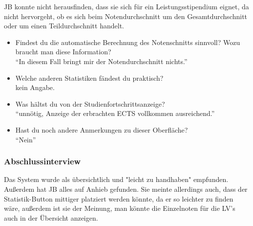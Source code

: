 \documentclass[a4paper,10pt]{scrartcl}
\begin{document}
JB konnte nicht herausfinden, dass sie sich für ein Leistungsstipendium eignet, da nicht hervorgeht, ob es sich beim Notendurchschnitt um den Gesamtdurchschnitt oder um einen Teildurchschnitt handelt.

\begin{itemize}

\item Findest du die automatische Berechnung des Notenschnitts sinnvoll? Wozu braucht man diese Information? \\

``In diesem Fall bringt mir der Notendurchschnitt nichts.''\\

\item  Welche anderen Statistiken fändest du praktisch? \\

kein Angabe.\\

\item  Was hältst du von der Studienfortschrittsanzeige? \\

``unnötig, Anzeige der erbrachten ECTS vollkommen ausreichend.''\\

\item  Hast du noch andere Anmerkungen zu dieser Oberfläche?  \\

``Nein''\\

\end{itemize}

\subsubsection*{Abschlussinterview}

Das System wurde als übersichtlich und "leicht zu handhaben" empfunden. Außerdem hat JB alles auf Anhieb gefunden. Sie meinte allerdings auch, dass der Statistik-Button mittiger platziert werden könnte, da er so leichter zu finden wäre, außerdem ist sie der Meinung, man könnte die Einzelnoten für die LV's auch in der Übersicht anzeigen.


\end{document}
